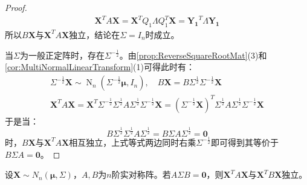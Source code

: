 \begin{proof}
\begin{gather*}
		\mathbf{X}^TA\mathbf{X}=\mathbf{X}^TQ_1\varLambda Q_1^T\mathbf{X}=\mathbf{Y_1}^T\varLambda\mathbf{Y_1}
	\end{gather*}
	所以$B\mathbf{X}$与$\mathbf{X}^TA\mathbf{X}$独立，结论在$\Sigma=I_n$时成立。\par
	当$\Sigma$为一般正定阵时，存在$\Sigma^{-\frac{1}{2}}$。由\cref{prop:ReverseSquareRootMat}(3)和\cref{cor:MultiNormalLinearTransform}(1)可得此时有：
	\begin{gather*}
		\Sigma^{-\frac{1}{2}}\mathbf{X}\sim\operatorname{N}_n(\Sigma^{-\frac{1}{2}}\boldsymbol{\mu},I_n),\quad B\mathbf{X}=B\Sigma^{\frac{1}{2}}\Sigma^{-\frac{1}{2}}\mathbf{X} \\
		\mathbf{X}^TA\mathbf{X}=\mathbf{X}^T\Sigma^{-\frac{1}{2}}\Sigma^{\frac{1}{2}}A\Sigma^{\frac{1}{2}}\Sigma^{-\frac{1}{2}}\mathbf{X}=(\Sigma^{-\frac{1}{2}}\mathbf{X})^T\Sigma^{\frac{1}{2}}A\Sigma^{\frac{1}{2}}\Sigma^{-\frac{1}{2}}\mathbf{X}
	\end{gather*}
	于是当：
	\begin{equation*}
		B\Sigma^{\frac{1}{2}}\Sigma^{\frac{1}{2}}A\Sigma^{\frac{1}{2}}=B\Sigma A\Sigma^{\frac{1}{2}}=\mathbf{0}
	\end{equation*}
	时，$B\mathbf{X}$与$\mathbf{X}^TA\mathbf{X}$相互独立，上式等式两边同时右乘$\Sigma^{-\frac{1}{2}}$即可得到其等价于$B\Sigma A=\mathbf{0}$。
\end{proof}
\begin{theorem}\label{theo:XAXXBXIndependent}
	设$\mathbf{X}\sim N_n(\boldsymbol{\mu},\Sigma)$，$A,B$为$n$阶实对称阵。若$A\Sigma B=\mathbf{0}$，则$\mathbf{X}^TA\mathbf{X}$与$\mathbf{X}^TB\mathbf{X}$独立。
\end{theorem}
